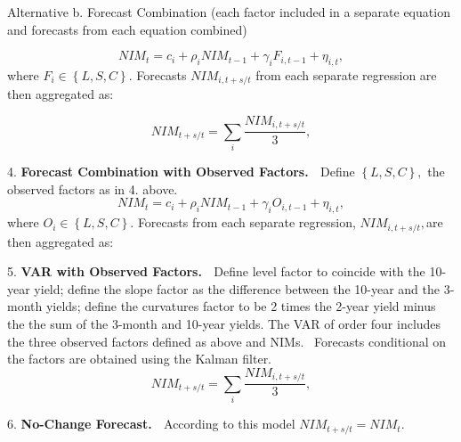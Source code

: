 \documentclass[12pt]{article}
\begin{document}
Alternative b. {\normalsize Forecast Combination (each factor included in a
separate equation and forecasts from each equation combined) }

\begin{equation*}
NIM_{t}=c_{i}+\rho _{i}NIM_{t-1}+\gamma _{i}F_{i,t-1}+{\eta _{i,t},}
\end{equation*}%
where $F_{i}\in \left\{ L,S,C\right\} .$ Forecasts $NIM_{i,t+s/t}$ from each
separate regression are then aggregated as:

\begin{equation*}
NIM_{t+s/t}=\sum_{i}\frac{NIM_{i,t+s/t}}{3},
\end{equation*}


4. \textbf{Forecast Combination with Observed Factors. \ }Define $\left\{
L,S,C\right\} ,$ the observed factors as in 4. above.
\begin{equation*}
NIM_{t}=c_{i}+\rho _{i}NIM_{t-1}+\gamma _{i}O_{i,t-1}+{\eta _{i,t},}
\end{equation*}%
where $O_{i}\in \left\{ L,S,C\right\} .$ Forecasts  from each separate
regression, $NIM_{i,t+s/t},$are then aggregated as:

5. \textbf{VAR with Observed Factors. \ }{\normalsize Define level factor to
coincide with the 10-year yield; define the slope factor as the difference
between the 10-year and the 3-month yields; define the curvatures factor to
be 2 times the 2-year yield minus the the sum of the 3-month and 10-year
yields. }The VAR of order four includes the three observed factors defined
as above and NIMs. \ Forecasts conditional on the factors are obtained using
the Kalman filter.
\begin{equation*}
NIM_{t+s/t}=\sum_{i}\frac{NIM_{i,t+s/t}}{3},
\end{equation*}

6. \textbf{No-Change Forecast. \ }{\normalsize According to this model }$%
NIM_{t+s/t}=NIM_{t}${\normalsize . }
\end{document}
